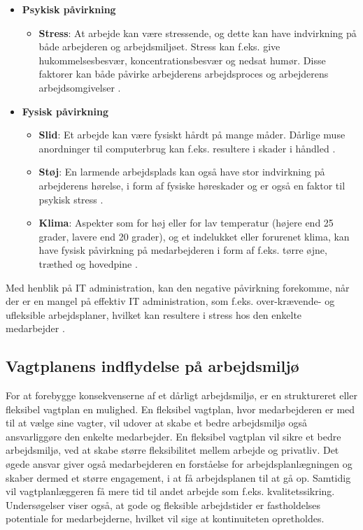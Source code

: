 \begin{itemize}
    \item {\textbf{Psykisk påvirkning} \citep{Arbejdsmiljoe_psykisk}}
    \begin{itemize}
    \item {\textbf{Stress}: At arbejde kan være stressende, og dette kan have indvirkning på både arbejderen og arbejdsmiljøet. Stress kan f.eks. give hukommelsesbesvær, koncentrationsbesvær og nedsat humør. Disse faktorer kan både påvirke arbejderens arbejdsproces og arbejderens arbejdsomgivelser \citep{Arbejdsmiljoe_stress}.}\\
    \end{itemize}
    \item {\textbf{Fysisk påvirkning} \citep{Arbejdsmiljoe_fysisk}}
    \begin{itemize}
    \item {\textbf{Slid}: Et arbejde kan være fysiskt hårdt på mange måder. Dårlige muse anordninger til computerbrug kan f.eks. resultere i skader i håndled \citep{Arbejdsmiljoe_fysisk}.}
    \item {\textbf{Støj}: En larmende arbejdsplads kan også have stor indvirkning på arbejderens hørelse, i form af fysiske høreskader og er også en faktor til psykisk stress \citep{Arbejdsmiljoe_stoej}.}
    \item {\textbf{Klima}: Aspekter som for høj eller for lav temperatur (højere end 25 grader, lavere end 20 grader), og et indelukket eller forurenet klima, kan have fysisk påvirkning på medarbejderen i form af f.eks. tørre øjne, træthed og hovedpine \citep{Arbejdsmiljoe_indeklima}.}\\
    \end{itemize}
\end{itemize}

Med henblik på IT administration, kan den negative påvirkning forekomme, når der er en mangel på effektiv IT administration, som f.eks. over-krævende- og ufleksible arbejdsplaner, hvilket kan resultere i stress hos den enkelte medarbejder \citep{Cambridge2011}.

\subsection{Vagtplanens indflydelse på arbejdsmiljø}
For at forebygge konsekvenserne af et dårligt arbejdsmiljø, er en struktureret eller fleksibel vagtplan en mulighed. En fleksibel vagtplan, hvor medarbejderen er med til at vælge sine vagter, vil udover at skabe et bedre arbejdsmiljø også ansvarliggøre den enkelte medarbejder. En fleksibel vagtplan vil sikre et bedre arbejdsmiljø, ved at skabe større fleksibilitet mellem arbejde og privatliv. Det øgede ansvar giver også medarbejderen en forståelse for arbejdsplanlægningen og skaber dermed et større engagement, i at få arbejdsplanen til at gå op. Samtidig vil vagtplanlæggeren få mere tid til andet arbejde som f.eks. kvalitetssikring.
Undersøgelser viser også, at gode og fleksible arbejdstider er fastholdelses potentiale for medarbejderne, hvilket vil sige at kontinuiteten opretholdes. \citep{It_armil} 

